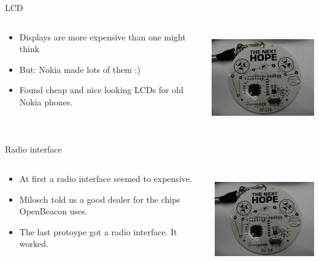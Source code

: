 \documentclass{beamer}
\begin{document}
\begin{frame}{LCD}
  \begin{columns}
    \begin{column}{6cm}
        \begin{itemize}
		\item Displays are more expensive than one might think
		\item But: Nokia made lots of them :)
		\item Found cheap and nice looking LCDs for old Nokia phones.
	\end{itemize}
    \end{column}
    \begin{column}{6cm}
        \includegraphics[height=4cm]{bilder/lcd.jpg}
    \end{column}
  \end{columns}
\end{frame}
\begin{frame}{Radio interface}
  \begin{columns}
    \begin{column}{6cm}
        \begin{itemize}
		\item At first a radio interface seemed to expensive.
		\item Milosch told us a good dealer for the chips OpenBeacon uses.
		\item The last protoype got a radio interface. It worked.
	\end{itemize}
    \end{column}
    \begin{column}{6cm}
        \includegraphics[height=4cm]{bilder/radio.jpg}
    \end{column}
  \end{columns}
\end{frame}
\end{document}
